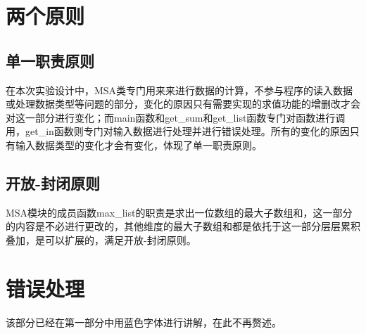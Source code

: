 \documentclass{article}
\begin{document}
\section{两个原则}
\subsection{单一职责原则}
在本次实验设计中，MSA类专门用来来进行数据的计算，不参与程序的读入数据或处理数据类型等问题的部分，变化的原因只有需要实现的求值功能的增删改才会对这一部分进行变化；而main函数和get\_sum和get\_list函数专门对函数进行调用，get\_in函数则专门对输入数据进行处理并进行错误处理。所有的变化的原因只有输入数据类型的变化才会有变化，体现了单一职责原则。
\subsection{开放-封闭原则}
MSA模块的成员函数max\_list的职责是求出一位数组的最大子数组和，这一部分的内容是不必进行更改的，其他维度的最大子数组和都是依托于这一部分层层累积叠加，是可以扩展的，满足开放-封闭原则。
\section{错误处理}
该部分已经在第一部分中用\textcolor[rgb]{0,0.8,1}{蓝色字体}进行讲解，在此不再赘述。
\newpage
\end{document}
